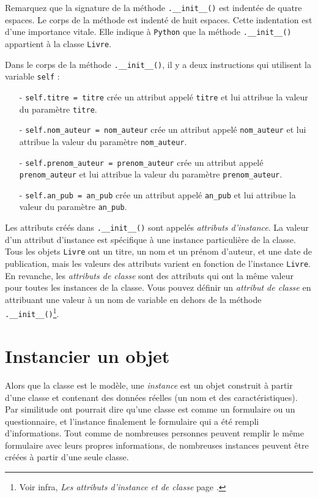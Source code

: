 \documentclass[a4paper,12pt]{book}
\begin{document}
Remarquez que la signature de la méthode \texttt{.\_\_init\_\_()} est indentée de quatre espaces. Le corps de la méthode est indenté de huit espaces. Cette indentation est d'une importance vitale. Elle indique à \texttt{Python} que la méthode \texttt{.\_\_init\_\_()} appartient à la classe \texttt{Livre}.
\medskip

Dans le corps de la méthode \texttt{.\_\_init\_\_()}, il y a deux instructions qui utilisent la variable \texttt{self} :
\begin{itemize}
	\item[- \texttt{self.titre = titre}] crée un attribut appelé \texttt{titre} et lui attribue la valeur du paramètre \texttt{titre}.
    \item[- \texttt{self.nom\_auteur = nom\_auteur}] crée un attribut appelé \texttt{nom\_auteur} et lui attribue la valeur du paramètre \texttt{nom\_auteur}.
    \item[- \texttt{self.prenom\_auteur = prenom\_auteur}] crée un attribut appelé \texttt{prenom\_auteur} et lui attribue la valeur du paramètre \texttt{prenom\_auteur}.
    \item[- \texttt{self.an\_pub = an\_pub}] crée un attribut appelé \texttt{an\_pub} et lui attribue la valeur du paramètre \texttt{an\_pub}.
\end{itemize}
\medskip

Les attributs créés dans \texttt{.\_\_init\_\_()} sont appelés \textit{attributs d'instance}. La valeur d'un attribut d'instance est spécifique à une instance particulière de la classe. Tous les objets \texttt{Livre} ont un titre, un nom et un prénom d'auteur, et une date de publication, mais les valeurs des attributs varient en fonction de l'instance \texttt{Livre}. En revanche, les \textit{attributs de classe} sont des attributs qui ont la même valeur pour toutes les instances de la classe. Vous pouvez définir un \textit{attribut de classe} en attribuant une valeur à un nom de variable en dehors de la méthode \texttt{.\_\_init\_\_()}\footnote{Voir infra, \textit{Les attributs d'instance et de classe} page \pageref{AttributDeClasse}.}.
\medskip

\section{Instancier un objet}
Alors que la classe est le modèle, une \textit{instance} est un objet construit à partir d'une classe et contenant des données réelles (un nom et des caractéristiques). Par similitude ont pourrait dire qu'une classe est comme un formulaire ou un questionnaire, et l'instance finalement le formulaire qui a été rempli d'informations. Tout comme de nombreuses personnes peuvent remplir le même formulaire avec leurs propres informations, de nombreuses instances peuvent être créées à partir d'une seule classe.
\medskip
\end{document}
